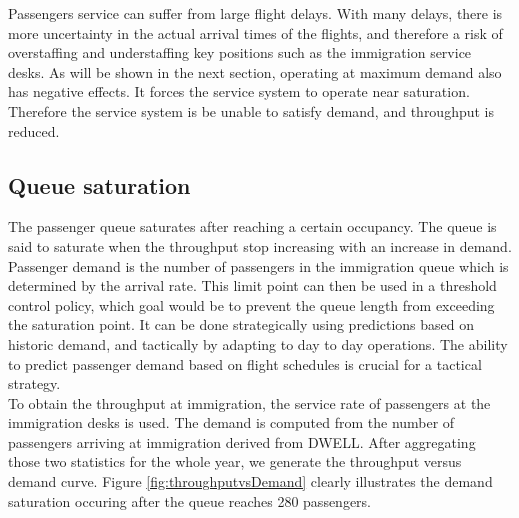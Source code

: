 \documentclass[11pt,onecolumn]{IEEEtran}
\begin{document}
Passengers service can suffer from large flight delays. With many delays, there is more uncertainty in the actual arrival times of the flights, and therefore a risk of overstaffing and understaffing key positions such as the immigration service desks. 
As will be shown in the next section, operating at  maximum demand also has negative effects. It forces the service system to operate near saturation. Therefore the service system is be unable to satisfy demand, and throughput is reduced. 


\clearpage
\subsection{Queue saturation}
The passenger queue saturates after reaching a certain occupancy. The queue is said to saturate when the throughput stop increasing with an increase in demand. 
Passenger demand is the number of passengers in the immigration queue which is determined by the arrival rate.
This limit point can then be used in a threshold control policy, which goal would be to prevent the queue length from exceeding the saturation point.
It can be done strategically using predictions based on historic demand, and tactically by adapting to day to day operations.
The ability to predict passenger demand based on flight schedules is crucial for a tactical strategy.  \\
To obtain the throughput at immigration, the service rate of passengers at the immigration desks is used.
The demand is computed from the number of passengers arriving at immigration derived from DWELL.
After aggregating those two statistics for the whole year, we generate the throughput versus demand curve. 
Figure \ref{fig:throughputvsDemand} clearly illustrates the demand saturation occuring after the queue reaches 280 passengers.\\
\end{document}
